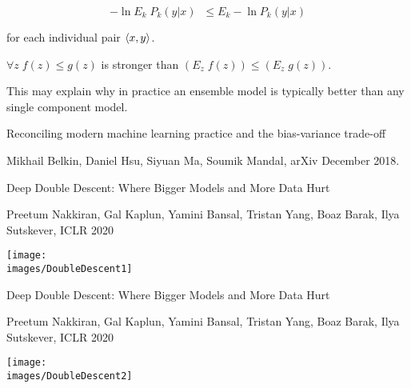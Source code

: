 {$$-\ln E_k \;P_k(y|x) \;\;\leq E_k -\ln P_k(y|x)$$

\vfill
for each individual pair ${\mbox{$\langle x,y\rangle$}}$.

\vfill
$\forall z\; f(z) \leq g(z)$ is stronger than $(E_z\;f(z)) \leq (E_z\; g(z))$.

\vfill
This may explain why in practice an ensemble model is typically better than any single component model.


{\huge
Reconciling modern machine learning practice and the bias-variance trade-off

\bigskip
Mikhail Belkin, Daniel Hsu, Siyuan Ma, Soumik Mandal, arXiv December 2018.

\vfill
Deep Double Descent: Where Bigger Models and More Data Hurt

\bigskip
Preetum Nakkiran, Gal Kaplun, Yamini Bansal, Tristan Yang, Boaz Barak, Ilya Sutskever, ICLR 2020
}


\centerline{\texttt{[image: \\images/DoubleDescent1]}}

\vfill
Deep Double Descent: Where Bigger Models and More Data Hurt

\bigskip
Preetum Nakkiran, Gal Kaplun, Yamini Bansal, Tristan Yang, Boaz Barak, Ilya Sutskever, ICLR 2020


\centerline{\texttt{[image: \\images/DoubleDescent2]}}


}

